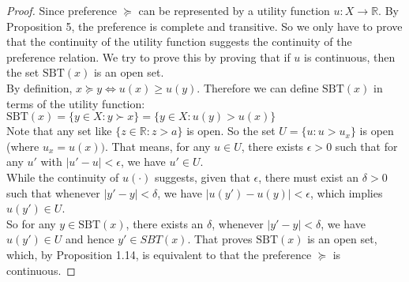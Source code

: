 \documentclass{article}
\begin{document}
\begin{proof}
Since preference $\succeq$ can be represented by a utility 
function $u: X \to \mathbb{R}$. By Proposition 5, the preference 
is complete and transitive. So we only have to prove that 
the continuity of the utility function suggests the continuity 
of the preference relation. We try to prove this by proving that 
if $u$ is continuous, then the set $\textrm{SBT}(x)$ 
is an open set. \\

By definition, $x \succeq y \Leftrightarrow u(x) \geq u(y)$. 
Therefore we can define $\textrm{SBT}(x)$ in terms of the 
utility function: 
$\textrm{SBT}(x) = \{y \in X: y \succ x\} 
                 = \{ y \in X: u(y) > u(x) \}$\\

Note that any set like $\{z \in \mathbb{R}: z > a \}$ is open.
So the set $U = \{ u: u > u_x \}$ is open (where $u_x=u(x))$. 
That means, for any $u \in U$, there exists $\epsilon>0$ 
such that for any $u'$ with $|u'-u|<\epsilon$, we have $u' \in U$. \\

While the continuity of $u(\cdot)$ suggests, given that $\epsilon$, 
there must exist an $\delta>0$ such that whenever 
$|y'-y|<\delta$, we have $|u(y')-u(y)|<\epsilon$, 
which implies $u(y') \in U$.\\

So for any $y \in \textrm{SBT}(x)$, there exists an $\delta$, whenever $|y'-y|<\delta$, we have $u(y') \in U$ and hence 
$y' \in SBT(x)$. That proves $\textrm{SBT}(x)$ is an open set,
which, by Proposition 1.14, is equivalent to that 
the preference $\succeq$ is continuous.

\end{proof}
\end{document}
